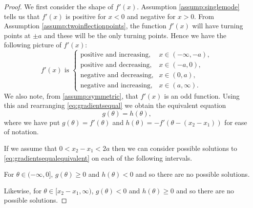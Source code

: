 		\begin{proof}
			We first consider the shape of $f'(x)$. Assumption \ref{assump:singlemode} tells us that $f'(x)$ is positive for $x<0$ and negative for $x>0$. 
			From Assumption \ref{assump:twoinflectionpoints}, the function $f'(x)$ will have turning points at $\pm a$ and these will be the only turning points.
			Hence we have the following picture of $f'(x)$:
			\begin{equation}
				f'(x) \text{ is } 
				\begin{cases}
					\text{positive and increasing,} &x \in (-\infty,-a),\\
					\text{positive and decreasing,} &x \in (-a,0),\\
					\text{negative and decreasing,} &x \in (0,a),\\
					\text{negative and increasing,} &x \in (a,\infty).
				\end{cases}
			\end{equation}
			We also note, from \ref{assump:symmetric}, that $f'(x)$ is an odd function. Using this and rearranging \eqref{eq:gradientsequal} we obtain the equivalent equation
			\begin{equation}
				g(\theta) = h(\theta),
				\label{eq:gradientsequalequivalent}
			\end{equation}
			where we have put $g(\theta) = f'(\theta)$ and $h(\theta) = -f'(\theta - (x_2 - x_1))$ for ease of notation.
			
			If we assume that $0< x_2 - x_1 < 2a$ then we can consider possible solutions to \eqref{eq:gradientsequalequivalent} on each of the following intervals. 
			
			For $\theta \in (-\infty, 0]$, $g(\theta)\geq 0$ and $h(\theta) < 0$ and so there are no possible solutions.
			
			Likewise, for $\theta \in [x_2 - x_1,\infty)$, $g(\theta)<0$ and $h(\theta) \geq 0$ and so there are no possible solutions.
			

\end{proof}
